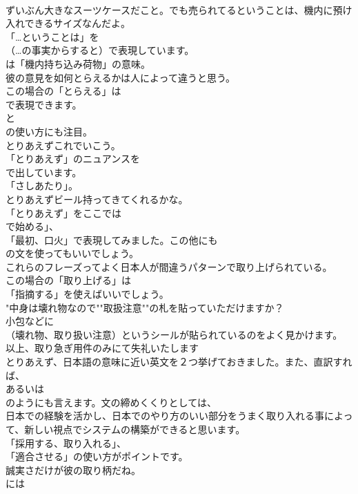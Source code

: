 \documentclass[8pt]{extreport}
\begin{document}
\begin{CJK}{UTF8}{min}
\\	ずいぶん大きなスーツケースだこと。でも売られてるということは、機内に預け入れできるサイズなんだよ。 
\\	「…ということは」を 
\\	（…の事実からすると）で表現しています。
\\	は「機内持ち込み荷物」の意味。	
\\	彼の意見を如何とらえるかは人によって違うと思う。 
\\	この場合の「とらえる」は
\\	で表現できます。
\\	と
\\	の使い方にも注目。	
\\	とりあえずこれでいこう。 
\\	「とりあえず」のニュアンスを
\\	で出しています。
\\	「さしあたり」。	
\\	とりあえずビール持ってきてくれるかな。 
\\	「とりあえず」をここでは
\\	で始める」、
\\	「最初、口火」で表現してみました。この他にも
\\	の文を使ってもいいでしょう。	
\\	これらのフレーズってよく日本人が間違うパターンで取り上げられている。 
\\	この場合の「取り上げる」は
\\	「指摘する」を使えばいいでしょう。	
\\	"中身は壊れ物なので""取扱注意""の札を貼っていただけますか？ 
\\	小包などに
\\	（壊れ物、取り扱い注意）というシールが貼られているのをよく見かけます。
\\	以上、取り急ぎ用件のみにて失礼いたします 
\\	とりあえず、日本語の意味に近い英文を２つ挙げておきました。また、直訳すれば、
\\	あるいは 
\\	のようにも言えます。文の締めくくりとしては、
\\	日本での経験を活かし、日本でのやり方のいい部分をうまく取り入れる事によって、新しい視点でシステムの構築ができると思います。 
\\	「採用する、取り入れる」、
\\	「適合させる」の使い方がポイントです。	
\\	誠実さだけが彼の取り柄だね。 
\\	には

\end{CJK}
\end{document}
